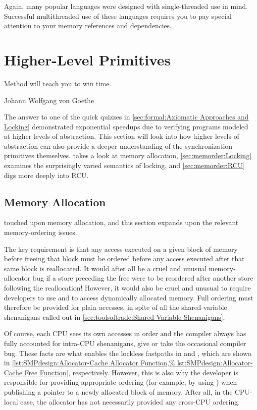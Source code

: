 Again, many popular languages were designed with single-threaded use
in mind.
Successful multithreaded use of these languages requires you to pay
special attention to your memory references and dependencies.

\section{Higher-Level Primitives}
\label{sec:memorder:Higher-Level Primitives}
%
\epigraph{Method will teach you to win time.}
	 {Johann Wolfgang von Goethe}

The answer to one of the quick quizzes in
\cref{sec:formal:Axiomatic Approaches and Locking}
demonstrated exponential speedups due to verifying programs
modeled at higher levels of abstraction.
This section will look into how higher levels of abstraction can
also provide a deeper understanding of the synchronization primitives
themselves.
takes a look at memory allocation,
\cref{sec:memorder:Locking}
examines the surprisingly varied semantics of locking, and
\cref{sec:memorder:RCU}
digs more deeply into RCU\@.

\subsection{Memory Allocation}
\label{sec:memorder:Memory Allocation}

touched upon memory allocation, and this section expands upon the relevant
memory-ordering issues.

The key requirement is that any access executed on a given block of
memory before freeing that block must be ordered before any access
executed after that same block is reallocated.
It would after all be a cruel and unusual memory-allocator bug if a store
preceding the free were to be reordered after another store following
the reallocation!
However, it would also be cruel and unusual to require developers to use
 and  to access dynamically allocated
memory.
Full ordering must therefore be provided for plain accesses, in spite of
all the shared-variable shenanigans called out in
\cref{sec:toolsoftrade:Shared-Variable Shenanigans}.

Of course, each CPU sees its own accesses in order and the compiler
always has fully accounted for intra-CPU shenanigans, give or take
the occasional compiler bug.
These facts are what enables the lockless fastpaths in
 and , which are shown in
\cref{lst:SMPdesign:Allocator-Cache Allocator Function,%
lst:SMPdesign:Allocator-Cache Free Function},
respectively.
However, this is also why the developer is responsible for providing
appropriate ordering (for example, by using )
when publishing a pointer to a newly allocated block of memory.
After all, in the CPU-local case, the allocator has not necessarily
provided any cross-CPU ordering.

